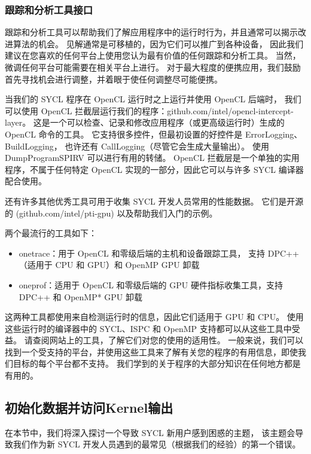 \subsubsection{跟踪和分析工具接口}
跟踪和分析工具可以帮助我们了解应用程序中的运行时行为，并且通常可以揭示改进算法的机会。 
见解通常是可移植的，因为它们可以推广到各种设备，
因此我们建议在您喜欢的任何平台上使用您认为最有价值的任何跟踪和分析工具。 
当然，微调任何平台可能需要在相关平台上进行。 
对于最大程度的便携应用，我们鼓励首先寻找机会进行调整，并着眼于使任何调整尽可能便携。

当我们的 SYCL 程序在 OpenCL 运行时之上运行并使用 OpenCL 后端时，
我们可以使用 OpenCL 拦截层运行我们的程序：github.com/intel/opencl-intercept-layer。 
这是一个可以检查、记录和修改应用程序（或更高级运行时）生成的 OpenCL 命令的工具。 
它支持很多控件，但最初设置的好控件是 ErrorLogging、BuildLogging，
也许还有 CallLogging（尽管它会生成大量输出）。 使用 DumpProgramSPIRV 可以进行有用的转储。 
OpenCL 拦截层是一个单独的实用程序，不属于任何特定 OpenCL 实现的一部分，因此它可以与许多 SYCL 编译器配合使用。

还有许多其他优秀工具可用于收集 SYCL 开发人员常用的性能数据。 
它们是开源的 (github.com/intel/pti-gpu) 以及帮助我们入门的示例。

两个最流行的工具如下：

\begin{itemize}
	\item onetrace：用于 OpenCL 和零级后端的主机和设备跟踪工具，
	支持 DPC++（适用于 CPU 和 GPU）和 OpenMP GPU 卸载

	\item oneprof：适用于 OpenCL 和零级后端的 GPU 硬件指标收集工具，支持 DPC++ 和 OpenMP* GPU 卸载
\end{itemize}

这两种工具都使用来自检测运行时的信息，因此它们适用于 GPU 和 CPU。 
使用这些运行时的编译器中的 SYCL、ISPC 和 OpenMP 支持都可以从这些工具中受益。 
请查阅网站上的工具，了解它们对您的使用的适用性。 
一般来说，我们可以找到一个受支持的平台，并使用这些工具来了解有关您的程序的有用信息，即使我们目标的每个平台都不支持。 
我们学到的关于程序的大部分知识在任何地方都是有用的。

\subsection{初始化数据并访问Kernel输出}
在本节中，我们将深入探讨一个导致 SYCL 新用户感到困惑的主题，
该主题会导致我们作为新 SYCL 开发人员遇到的最常见（根据我们的经验）的第一个错误。

